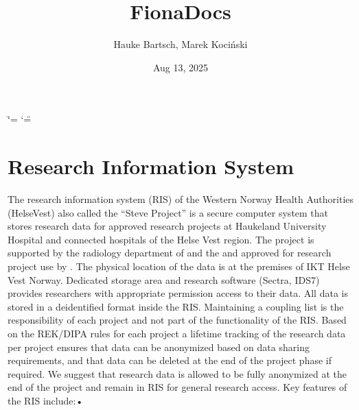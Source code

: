 \documentclass[letterpaper,10pt,english]{sphinxmanual}
\title{FionaDocs}
\date{Aug 13, 2025}
\author{Hauke Bartsch, Marek Kociński}
\begin{document}
\ifdefined\shorthandoff
  \ifnum\catcode`\=\string=\active\shorthandoff{=}\fi
  \ifnum\catcode`\"=\active{}\fi
\fi

\pagestyle{empty}
\sphinxmaketitle
\pagestyle{plain}
\sphinxtableofcontents
\pagestyle{normal}
\label{\detokenize{index::doc}}



\chapter{Research Information System}
\label{\detokenize{index:research-information-system}}
\sphinxAtStartPar
The research information system (RIS) of the Western Norway Health Authorities (Helse\sphinxhyphen{}Vest) also called the “Steve Project” is a secure computer system that stores
research data for approved research projects at Haukeland University Hospital and connected hospitals of the Helse Vest region. The project is supported by the
radiology department of  and the  and approved for research project use by . The physical location of the data is at the premises of IKT Helse Vest Norway. Dedicated storage area and research software (Sectra, IDS7) provides researchers with
appropriate permission access to their data. All data is stored in a de\sphinxhyphen{}identified format inside the RIS. Maintaining a coupling list is the responsibility of each project
and not part of the functionality of the RIS. Based on the REK/DIPA rules for each project a lifetime tracking of the research data
per project ensures that data can be anonymized based on data sharing requirements, and that data can be deleted at the end of the project phase \sphinxhyphen{} if
required. We suggest that research data is allowed to be fully anonymized at the end of the project and remain in RIS for general research access.
Key features of the RIS include:•
\end{document}
